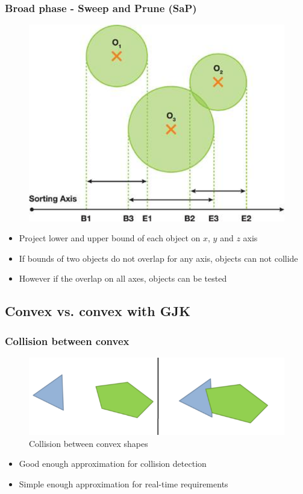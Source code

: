 \documentclass{beamer}
\begin{document}
\begin{frame}
  \frametitle{Broad phase - Sweep and Prune (SaP)}

  \begin{figure}
    \centering
    \includegraphics[width=0.5\linewidth]{sap.png}
  \end{figure}

  \begin{itemize}
  \item Project lower and upper bound of each object on $x$, $y$ and $z$ axis
  \item If bounds of two objects do not overlap for any axis, objects can not collide
  \item However if the overlap on all axes, objects can be tested
  \end{itemize}

\end{frame}

\subsection{Convex vs. convex with GJK}
\begin{frame}
  \frametitle{Collision between convex}
  \begin{figure}[p]
    \centering
    \includegraphics[width=0.8\linewidth]{convexcollision}
    \caption{Collision between convex shapes}
  \end{figure}
  \begin{itemize}
  \item Good enough approximation for collision detection
  \item Simple enough approximation for real-time requirements
  \end{itemize}
\end{frame}
\end{document}
